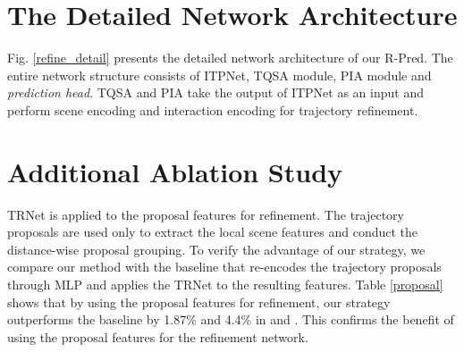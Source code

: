 \documentclass[10pt,twocolumn,letterpaper]{article}
\begin{document}
{\small


}

\clearpage
\setcounter{section}{0}
\renewcommand\thesection{\Alph{section}}
\section*{\LARGE\selectfont{Supplementary Material}}
\linespread{2.5}

\section{The Detailed Network Architecture}
Fig. \ref{refine_detail} presents the detailed network architecture of our R-Pred. The entire network structure consists of ITPNet, TQSA module, PIA module and {\it prediction head}. TQSA and PIA take the output of ITPNet as an input and perform scene encoding and interaction encoding for trajectory refinement. 

\linespread{1.0}

\section{Additional Ablation Study}
  TRNet is applied to  the proposal features for refinement. The trajectory proposals are used only to extract the local scene features and conduct the distance-wise proposal grouping. To verify the advantage of our strategy, we compare our method with the baseline that re-encodes the trajectory proposals through MLP and applies the TRNet to the resulting features. Table \ref{proposal} shows that by using the proposal features for refinement, our strategy outperforms the baseline by 1.87\% and 4.4\% in  and . 
This confirms the benefit of using the proposal features for the refinement network. 


\begin{table} [ht!]
    \centering {}
    \vspace{2pt}
    \caption{Ablation study. Comparison between our strategy and the baseline evaluated on the \textit{Argoverse validation set}.}
        \label{proposal} 
\end{table}
\end{document}
